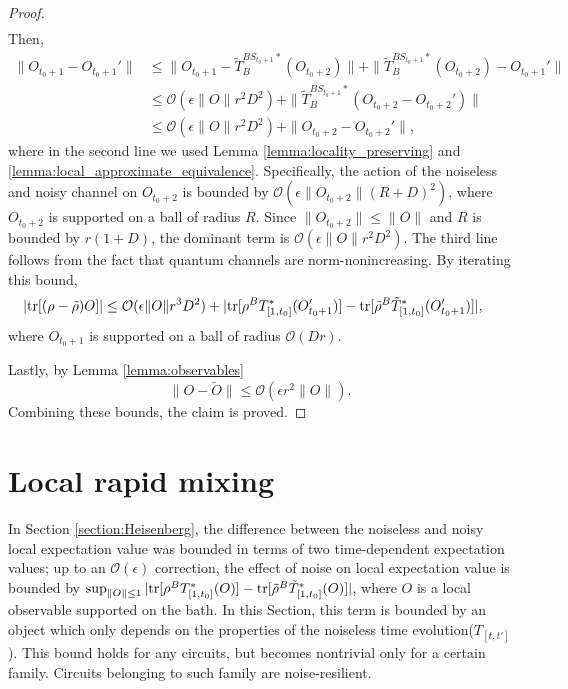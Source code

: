 \documentclass[prx,aps,amsmath,amssymb,floatfix,superscriptaddress,11pt,tightenlines,longbibliography,onecolumn,notitlepage]{revtex4-1}
\newcommand{\Tr}{\textnormal{tr}}
\begin{document}
\begin{proof}
\begin{equation}
\begin{aligned}
    \end{aligned}
  \end{equation}
  Then,
  \begin{equation}
    \begin{aligned}
      \|O_{t_0+1} - O_{t_0+1}'\| &\leq \|O_{t_0+1}- \tilde{T}_B^{BS_{t_0+1}*}(O_{t_0+2}) \|  + \|\tilde{T}_B^{BS_{t_0+1}*}(O_{t_0+2}) - O_{t_0+1}' \|  \\
      &\leq \mathcal{O}(\epsilon\|O \|r^2D^2) + \|\tilde{T}_B^{BS_{t_0+1}*}(O_{t_0+2} - O_{t_0+2}') \|\\
      &\leq \mathcal{O}(\epsilon\|O \|r^2D^2) + \|O_{t_0+2} - O_{t_0+2}' \|,
    \end{aligned}
  \end{equation}
  where in the second line we used Lemma \ref{lemma:locality_preserving} and \ref{lemma:local_approximate_equivalence}. Specifically, the action of the noiseless and noisy channel on $O_{t_0+2}$ is bounded by $\mathcal{O}(\epsilon \|O_{t_0+2}\| (R+D)^2)$, where $O_{t_0+2}$ is supported on a ball of radius $R$. Since $\|O_{t_0+2}\| \leq \|O \|$ and $R$ is bounded by $r(1+D)$, the dominant term is $\mathcal{O}(\epsilon \|O \|r^2D^2)$. The third line follows from the fact that quantum channels are norm-nonincreasing. By iterating this bound,
  \begin{equation}
    \begin{aligned}
      |\Tr[(\rho - \tilde{\rho})O ]| &\leq \mathcal{O}(\epsilon \|O \|r^3D^2) + |\Tr[\rho^BT_{[1,t_0]}^*(O_{t_0+1}')] - \Tr[\tilde{\rho}^B \tilde{T}_{[1,t_0]}^*(O_{t_0+1}')]|,
    \end{aligned}
  \end{equation}
  where $O_{t_0+1}$ is supported on a ball of radius $\mathcal{O}(Dr)$. 
  
    Lastly, by Lemma \ref{lemma:observables}
    \begin{equation}
      \|O - \tilde{O}\| \leq \mathcal{O}(\epsilon r^2\|O \| ).
    \end{equation}
    Combining these bounds, the claim is proved.
\end{proof}



\section{Local rapid mixing\label{section:local_uniform_contraction}}
In Section \ref{section:Heisenberg}, the difference between the noiseless and noisy local expectation value was bounded in terms of two time-dependent expectation values;  up to an $\mathcal{O}(\epsilon)$ correction, the effect of noise on local expectation value is bounded by  $\sup_{\|O\|\leq 1} |\Tr[\rho^BT_{[1,t_0]}^*(O)] - \Tr[\tilde{\rho}^B\tilde{T}_{[1,t_0]}^*(O)]|$, where $O$ is a local observable supported on the bath. In this Section, this term is bounded by an object which only depends on the properties of the noiseless time evolution($T_{[t,t']}$). This bound holds for any circuits, but becomes nontrivial only for a certain family. Circuits belonging to such family are noise-resilient.
\end{document}
